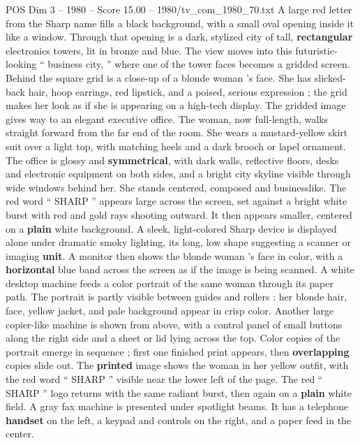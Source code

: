 \begin{textsample}{POS Dim 3 – 1980 – Score 15.00 – 1980/tv\_com\_1980\_70.txt}  \label{ex:f3_pos_041}
A large red letter from the Sharp name fills a black background, with a small oval opening inside it like a window.
Through that opening is a dark, stylized city of tall, \textbf{rectangular} electronics towers, lit in bronze and blue.
The view moves into this futuristic-looking “ business city, ” where one of the tower faces becomes a gridded screen.
Behind the square grid is a close-up of a blonde woman ’s face.
She has slicked-back hair, hoop earrings, red lipstick, and a poised, serious expression ; the grid makes her look as if she is appearing on a high-tech display.
The gridded image gives way to an elegant executive office.
The woman, now full-length, walks straight forward from the far end of the room.
She wears a mustard-yellow skirt suit over a light top, with matching heels and a dark brooch or lapel ornament.
The office is glossy and \textbf{symmetrical}, with dark walls, reflective floors, desks and electronic equipment on both sides, and a bright city skyline visible through wide windows behind her.
She stands centered, composed and businesslike.
The red word “ SHARP ” appears large across the screen, set against a bright white burst with red and gold rays shooting outward.
It then appears smaller, centered on a \textbf{plain} white background.
A sleek, light-colored Sharp device is displayed alone under dramatic smoky lighting, its long, low shape suggesting a scanner or imaging \textbf{unit}.
A monitor then shows the blonde woman ’s face in color, with a \textbf{horizontal} blue band across the screen as if the image is being scanned.
A white desktop machine feeds a color portrait of the same woman through its paper path.
The portrait is partly visible between guides and rollers : her blonde hair, face, yellow jacket, and pale background appear in crisp color.
Another large copier-like machine is shown from above, with a control panel of small buttons along the right side and a sheet or lid lying across the top.
Color copies of the portrait emerge in sequence ; first one finished print appears, then \textbf{overlapping} copies slide out.
The \textbf{printed} image shows the woman in her yellow outfit, with the red word “ SHARP ” visible near the lower left of the page.
The red “ SHARP ” logo returns with the same radiant burst, then again on a \textbf{plain} white field.
A gray fax machine is presented under spotlight beams.
It has a telephone \textbf{handset} on the left, a keypad and controls on the right, and a paper feed in the center.

\end{textsample}
